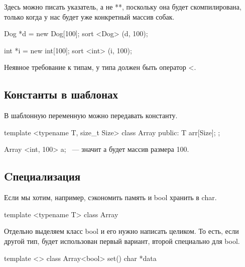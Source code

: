 Здесь можно писать указатель, а не **, поскольку она будет скомпилирована, только когда у нас будет уже конкретный массив собак.

\begin{cppcode}
Dog *d = new Dog[100];
sort <Dog> (d, 100);

int *i = new int[100];
sort <int> (i, 100);
\end{cppcode}

Неявное требование к типам, у типа должен быть оператор <.

\subsection{Константы в шаблонах}

В шаблонную переменную можно передавать константу. 

\begin{cppcode}
template <typename T, size_t Size>
class Array{
    public: 
        T arr[Size];
};
\end{cppcode}

Array <int, 100> a; ~--- значит а будет массив размера 100.

\subsection{Cпециализация}

Если мы хотим, например, сэкономить память и bool хранить в char.

\begin{cppcode}
template <typename T>
class Array{ 

}
\end{cppcode}

Отдельно выделяем класс bool  и его нужно написать целиком. То есть, если другой тип, будет использован первый вариант, второй специально для bool.

\begin{cppcode}
template <>
class Array<bool>{ 
    set(){
    }
    char *data
}
\end{cppcode}
